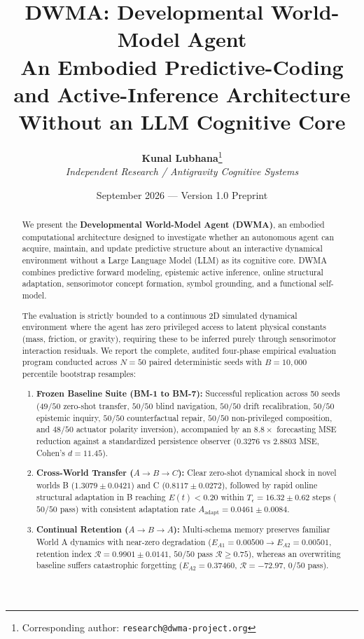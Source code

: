 \documentclass[11pt,a4paper]{article}
\title{\textbf{DWMA: Developmental World-Model Agent}\\
\large An Embodied Predictive-Coding and Active-Inference Architecture Without an LLM Cognitive Core}
\author{
  \textbf{Kunal Lubhana}\thanks{Corresponding author: \texttt{research@dwma-project.org}} \\
  \textit{Independent Research / Antigravity Cognitive Systems}
}
\date{September 2026 --- Version 1.0 Preprint}
\begin{document}
\maketitle

\begin{abstract}
We present the \textbf{Developmental World-Model Agent (DWMA)}, an embodied computational architecture designed to investigate whether an autonomous agent can acquire, maintain, and update predictive structure about an interactive dynamical environment without a Large Language Model (LLM) as its cognitive core. DWMA combines predictive forward modeling, epistemic active inference, online structural adaptation, sensorimotor concept formation, symbol grounding, and a functional self-model.

The evaluation is strictly bounded to a continuous 2D simulated dynamical environment where the agent has zero privileged access to latent physical constants (mass, friction, or gravity), requiring these to be inferred purely through sensorimotor interaction residuals. We report the complete, audited four-phase empirical evaluation program conducted across $N = 50$ paired deterministic seeds with $B = 10,000$ percentile bootstrap resamples:
\begin{enumerate}
    \item \textbf{Frozen Baseline Suite (BM-1 to BM-7):} Successful replication across 50 seeds ($49/50$ zero-shot transfer, $50/50$ blind navigation, $50/50$ drift recalibration, $50/50$ epistemic inquiry, $50/50$ counterfactual repair, $50/50$ non-privileged composition, and $48/50$ actuator polarity inversion), accompanied by an $8.8\times$ forecasting MSE reduction against a standardized persistence observer ($0.3276$ vs $2.8803$ MSE, Cohen's $d = 11.45$).
    \item \textbf{Cross-World Transfer ($A \to B \to C$):} Clear zero-shot dynamical shock in novel worlds B ($1.3079 \pm 0.0421$) and C ($0.8117 \pm 0.0272$), followed by rapid online structural adaptation in B reaching $E(t) < 0.20$ within $T_\epsilon = 16.32 \pm 0.62$ steps ($50/50$ pass) with consistent adaptation rate $A_{\text{adapt}} = 0.0461 \pm 0.0084$.
    \item \textbf{Continual Retention ($A \to B \to A$):} Multi-schema memory preserves familiar World A dynamics with near-zero degradation ($E_{A1} = 0.00500 \to E_{A2} = 0.00501$, retention index $\mathcal{R} = 0.9901 \pm 0.0141$, $50/50$ pass $\mathcal{R} \ge 0.75$), whereas an overwriting baseline suffers catastrophic forgetting ($E_{A2} = 0.37460$, $\mathcal{R} = -72.97$, $0/50$ pass).

\end{enumerate}
\end{abstract}
\end{document}
